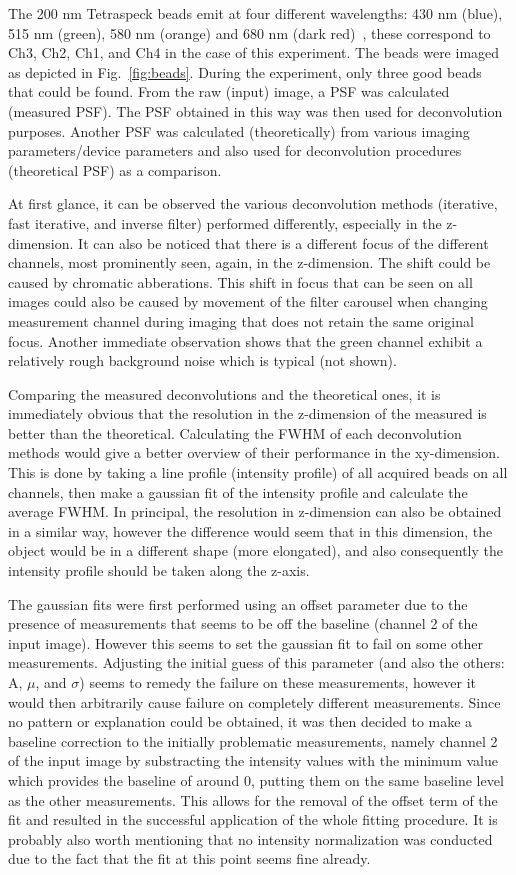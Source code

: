 The 200 nm Tetraspeck beads emit at four different wavelengths: 430 nm (blue), 515 nm (green), 580 nm (orange) and 680 nm (dark red)~\cite{Tetra}, these correspond to Ch3, Ch2, Ch1, and Ch4 in the case of this experiment. 
The beads were imaged as depicted in Fig.~\ref{fig:beads}. During the experiment, only three good beads that could be found. 
From the raw (input) image, a PSF was calculated (measured PSF). 
The PSF obtained in this way was then used for deconvolution purposes. Another PSF was calculated (theoretically) from various imaging parameters/device parameters and also used for deconvolution procedures (theoretical PSF) as a comparison. 

At first glance, it can be observed the various deconvolution methods (iterative, fast iterative, and inverse filter) performed differently, especially in the z-dimension. 
It can also be noticed that there is a different focus of the different channels, most prominently seen, again, in the z-dimension. 
The shift could be caused by chromatic abberations. 
This shift in focus that can be seen on all images could also be caused by movement of the filter carousel when changing measurement channel during imaging that does not retain the same original focus. 
Another immediate observation shows that the green channel exhibit a relatively rough background noise which is typical (not shown).

Comparing the measured deconvolutions and the theoretical ones, it is immediately obvious that the resolution in the z-dimension of the measured is better than the theoretical. 
Calculating the FWHM of each deconvolution methods would give a better overview of their performance in the xy-dimension. 
This is done by taking a line profile (intensity profile) of all acquired beads on all channels, then make a gaussian fit of the intensity profile and calculate the average FWHM.
In principal, the resolution in z-dimension can also be obtained in a similar way, however the difference would seem that in this dimension, the object would be in a different shape (more elongated), and also consequently the intensity profile should be taken along the z-axis.

The gaussian fits were first performed using an offset parameter due to the presence of measurements that seems to be off the baseline (channel 2 of the input image). 
However this seems to set the gaussian fit to fail on some other measurements. 
Adjusting the initial guess of this parameter (and also the others: A, $\mu$, and $\sigma$) seems to remedy the failure on these measurements, however it would then arbitrarily cause failure on completely different measurements. 
Since no pattern or explanation could be obtained, it was then decided to make a baseline correction to the initially problematic measurements, namely channel 2 of the input image by substracting the intensity values with the minimum value which provides the baseline of around 0, putting them on the same baseline level as the other measurements. 
This allows for the removal of the offset term of the fit and resulted in the successful application of the whole fitting procedure. 
It is probably also worth mentioning that no intensity normalization was conducted due to the fact that the fit at this point seems fine already.


